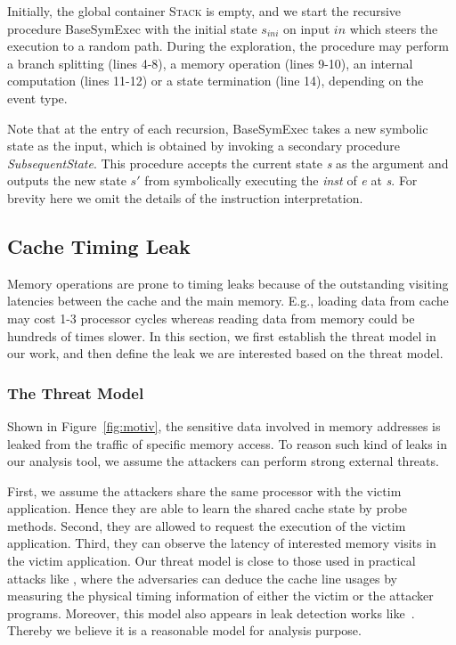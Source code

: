 \documentclass[sigconf, review]{acmart}
\newcommand{\SymExec}{\textsf{BaseSymExec} }
\begin{document}
Initially, the global container \textsc{Stack} is empty, and we start the
recursive procedure \SymExec with the initial state $\mathit{s_{ini}}$ 
on input $\mathit{in}$ which steers the execution to a random path. During 
the exploration, the procedure may perform a branch splitting (lines 4-8), 
a memory operation (lines 9-10), an internal computation (lines 11-12) or 
a state termination (line 14), depending on the event type.

Note that at the entry of each recursion, \SymExec takes a new symbolic 
state as the input, which is obtained by invoking a secondary procedure 
\textit{SubsequentState}. This procedure accepts the current state 
\textit{s} as the argument and outputs the new state $s'$ from symbolically 
executing the \textit{inst} of \textit{e} at \textit{s}. For brevity here 
we omit the details of the instruction interpretation.



\subsection{Cache Timing Leak}
\label{sec:leak}

Memory operations are prone to timing leaks because of the outstanding visiting
latencies between the cache and the main memory. E.g., loading data from cache 
may cost 1-3 processor cycles whereas reading data from memory could be hundreds 
of times slower. In this section, we first establish the threat model in our work, 
and then define the leak we are interested based on the threat model.


\subsubsection{The Threat Model}
Shown in Figure~\ref{fig:motiv}, the sensitive data involved in memory addresses 
is leaked from the traffic of specific memory access. To reason such kind of leaks 
in our analysis tool, we assume the attackers can perform strong external threats. 

First, we assume the attackers share the same processor with the victim application. 
Hence they are able to learn the shared cache state by probe methods. Second, they 
are allowed to request the execution of the victim application. Third, they can 
observe the latency of interested memory visits in the victim application. 
%
Our threat model is close to those used in practical attacks like
\cite{OsvikST06,YaromF14,DisselkoenKPT17}, where the adversaries can deduce the 
cache line usages by measuring the physical timing information of either the victim 
or the attacker programs. Moreover, this model also appears in leak detection works 
like~\cite{WangWLZW17,DoychevK17,WichelmannMES18,BrotzmanLZTK2018}. Thereby we 
believe it is a reasonable model for analysis purpose.
\end{document}
